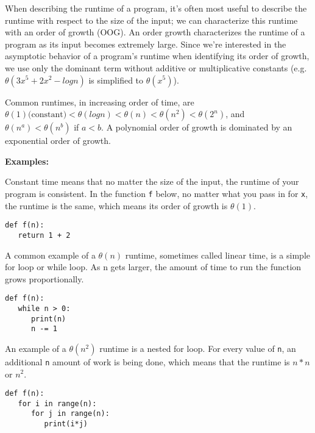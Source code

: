 \begin{blocksection}
When describing the runtime of a program, it’s often most useful to describe the runtime with respect to the size of the input; we can characterize this runtime with an order of growth (OOG).  An order growth characterizes the runtime of a program as its input becomes extremely large.  Since we’re interested in the asymptotic behavior of a program’s runtime when identifying its order of growth, we use only the dominant term without additive or multiplicative constants (e.g. $\theta(3x^5 + 2x^2 - log n)$ is simplified to $\theta(x^5)$).

Common runtimes, in increasing order of time, are $\theta(1) \text{(constant)} < \theta(log n) < \theta(n) < \theta(n^2) < \theta(2^n)$, and $\theta(n^a) < \theta(n^b)$ if $a < b$. A polynomial order of growth is dominated by an exponential order of growth.

\textbf{Examples:}

Constant time means that no matter the size of the input, the runtime of your program is consistent. In the function \lstinline{f} below, no matter what you pass in for \lstinline{x}, the runtime is the same, which means its order of growth is $\theta(1)$.
\vspace{1.5mm}
\begin{lstlisting}
def f(n):
   return 1 + 2
\end{lstlisting}
A common example of a $\theta(n)$ runtime, sometimes called linear time, is a simple for loop or while loop. As n gets larger, the amount of time to run the function grows proportionally.
\begin{lstlisting}
def f(n):
   while n > 0:
      print(n)
      n -= 1
\end{lstlisting}
An example of a $\theta(n^2)$ runtime is a nested for loop. For every value of \lstinline{n}, an additional \lstinline{n} amount of work is being done, which means that the runtime is $n*n$ or $n^2$.
\vspace{1.5mm}
\begin{lstlisting}
def f(n):
   for i in range(n):
      for j in range(n):
         print(i*j)
\end{lstlisting}

\end{blocksection}